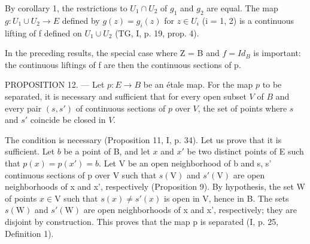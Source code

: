 By corollary 1, the restrictions to \(U_{1} \cap U_{2}\) of \(g_{1}\) and \(g_{2}\) are equal. The map \(g: U_{1} \cup U_{2} \to E\) defined by \(g(z) = g_{i}(z)\) for \(z \in U_{i}\) (i = 1, 2) is a continuous lifting of f defined on \(U_{1} \cup U_{2}\) (TG, I, p. 19, prop. 4).

In the preceding results, the special case where Z = B and \(f = Id_{B}\) is important: the continuous liftings of f are then the continuous sections of p.

PROPOSITION 12. --- Let \(p \colon E \to B\) be an étale map. For the map \(p\) to be separated, it is necessary and sufficient that for every open subset \(V\) of \(B\) and every pair \((s, s')\) of continuous sections of \(p\) over \(V\), the set of points where \(s\) and \(s'\) coincide be closed in \(V\).

The condition is necessary (Proposition 11, I, p. 34). Let us prove that it is sufficient. Let \(b\) be a point of B, and let \(x\) and \(x'\) be two distinct points of E such that \(p(x) = p(x') = b\). Let V be an open neighborhood of b and s, s' continuous sections of p over V such that \(s(\mathrm{V})\) and \(s'(\mathrm{V})\) are open neighborhoods of x and x', respectively (Proposition 9). By hypothesis, the set W of points \(x \in \mathrm{V}\) such that \(s(x) \ne s'(x)\) is open in V, hence in B. The sets \(s(\mathrm{W})\) and \(s'(\mathrm{W})\) are open neighborhoods of x and x', respectively; they are disjoint by construction. This proves that the map p is separated (I, p. 25, Definition 1).
